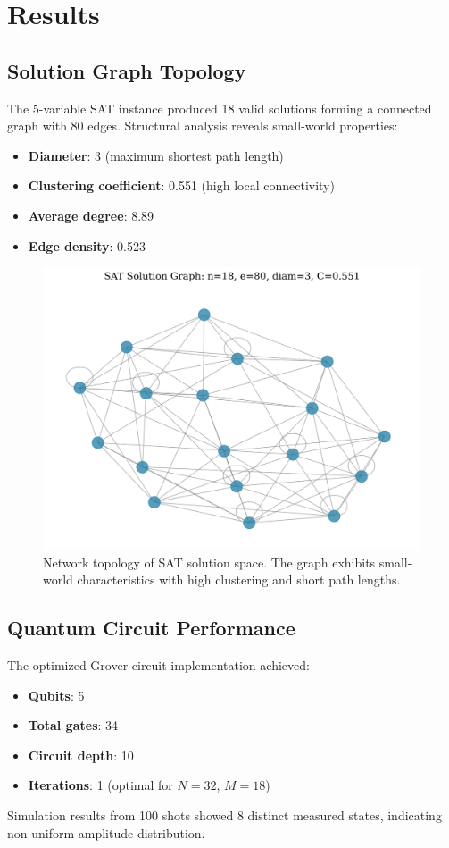 \section{Results}
\subsection{Solution Graph Topology}
The 5-variable SAT instance produced 18 valid solutions forming a connected graph with 80 edges. Structural analysis reveals small-world properties:

\begin{itemize}
    \item \textbf{Diameter}: 3 (maximum shortest path length)
    \item \textbf{Clustering coefficient}: 0.551 (high local connectivity)  
    \item \textbf{Average degree}: 8.89
    \item \textbf{Edge density}: 0.523
\end{itemize}

\begin{figure}[htbp]
\centering
\includegraphics[width=0.9\linewidth]{figures/solution_graph.png}
\caption{Network topology of SAT solution space. The graph exhibits small-world characteristics with high clustering and short path lengths.}
\label{fig:solution_graph}
\end{figure}

\subsection{Quantum Circuit Performance}
The optimized Grover circuit implementation achieved:
\begin{itemize}
    \item \textbf{Qubits}: 5
    \item \textbf{Total gates}: 34
    \item \textbf{Circuit depth}: 10
    \item \textbf{Iterations}: 1 (optimal for $N=32$, $M=18$)
\end{itemize}

Simulation results from 100 shots showed 8 distinct measured states, indicating non-uniform amplitude distribution.

